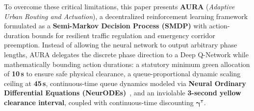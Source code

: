 To overcome these critical limitations, this paper presents \textbf{AURA} (\textit{Adaptive Urban Routing and Actuation}), a decentralized reinforcement learning framework formulated as a \textbf{Semi-Markov Decision Process (SMDP)} with action-duration bounds for resilient traffic regulation and emergency corridor preemption. Instead of allowing the neural network to output arbitrary phase lengths, AURA delegates the discrete phase direction to a Deep Q-Network while mathematically bounding action durations: a statutory minimum green allocation of \textbf{10\,s} to ensure safe physical clearance, a queue-proportional dynamic scaling ceiling at \textbf{45\,s}, continuous-time queue dynamics modeled via \textbf{Neural Ordinary Differential Equations (NeurODEs)}~\cite{chen2018neural}, and an inviolable \textbf{3-second yellow clearance interval}, coupled with continuous-time discounting $\mathbf{\gamma^{\tau}}$.


